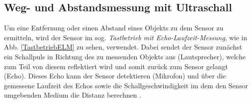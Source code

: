 

\subsection{Weg- und Abstandsmessung mit Ultraschall}

Um eine Entfernung oder einen Abstand eines Objekts zu dem Sensor zu ermitteln, wird der Sensor im sog. \textit{Tastbetrieb mit Echo-Laufzeit-Messung}, wie in Abb. \ref{TastbetriebELM} zu sehen, verwendet. Dabei sendet der Sensor zunächst ein Schallpuls in Richtung des zu messenden Objekts aus (Lautsprecher), welche zum Teil von diesem reflektiert wird und somit zurück zum Sensor gelangt (Echo). Dieses Echo kann der Sensor detektieren (Mikrofon) und über die gemessene Laufzeit des Echos sowie die Schallgeschwindigkeit im dem den Sensor umgebenden Medium die Distanz berechnen \cite{Hering:2023}.

